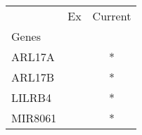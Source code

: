 \begin{tabular}{lcc}
\toprule
{} & Ex & Current \\
Genes   &    &         \\
\midrule
ARL17A  &    &       * \\
ARL17B  &    &       * \\
LILRB4  &    &       * \\
MIR8061 &    &       * \\
\bottomrule
\end{tabular}
